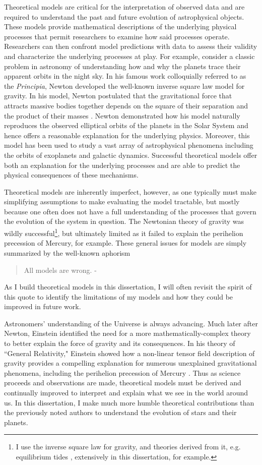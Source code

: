 Theoretical models are critical for the interpretation of observed data and are required to understand the past and future evolution of astrophysical objects. These models provide mathematical descriptions of the underlying physical processes that permit researchers to examine how said processes operate. Researchers can then confront model predictions with data to assess their validity and characterize the underlying processes at play. For example, consider a classic problem in astronomy of understanding how and why the planets trace their apparent orbits in the night sky. In his famous work colloquially referred to as the \textit{Principia}, Newton developed the well-known inverse square law model for gravity. In his model, Newton postulated that the gravitational force that attracts massive bodies together depends on the square of their separation and the product of their masses \citep{Newton1687,Newton1999}. Newton demonstrated how his model naturally reproduces the observed elliptical orbits of the planets in the Solar System and hence offers a reasonable explanation for the underlying physics. Moreover, this model has been used to study a vast array of astrophysical phenomena including the orbits of exoplanets and galactic dynamics. Successful theoretical models offer both an explanation for the underlying processes and are able to predict the physical consequences of these mechanisms.

Theoretical models are inherently imperfect, however, as one typically must make simplifying assumptions to make evaluating the model tractable, but mostly because one often does not have a full understanding of the processes that govern the evolution of the system in question. The Newtonian theory of gravity was wildly successful\footnote{I use the inverse square law for gravity, and theories derived from it, e.g. equilibrium tides \citep{Darwin1880}, extensively in this dissertation, for example.}, but ultimately limited as it failed to explain the perihelion precession of Mercury, for example. These general issues for models are simply summarized by the well-known aphorism
\begin{quote}
All models are wrong. - \citet{Box1976}
\end{quote}
As I build theoretical models in this dissertation, I will often revisit the spirit of this quote to identify the limitations of my models and how they could be improved in future work.

Astronomers' understanding of the Universe is always advancing. Much later after Newton, Einstein identified the need for a more mathematically-complex theory to better explain the force of gravity and its consequences. In his theory of ``General Relativity," Einstein showed how a non-linear tensor field description of gravity provides a compelling explanation for numerous unexplained gravitational phenomena, including the perihelion precession of Mercury \citep{Einstein1915b,Einstein1915a}. Thus as science proceeds and observations are made, theoretical models must be derived and continually improved to interpret and explain what we see in the world around us. In this dissertation, I make much more humble theoretical contributions than the previously noted authors to understand the evolution of stars and their planets. 

